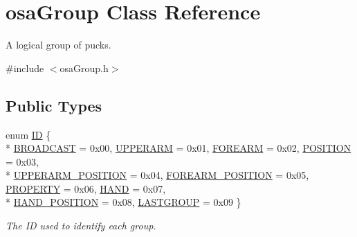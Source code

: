 \hypertarget{classosa_group}{\section{osa\-Group Class Reference}
\label{classosa_group}
}


A logical group of pucks.  




{\ttfamily \#include $<$osa\-Group.\-h$>$}

\subsection*{Public Types}
\begin{DoxyCompactItemize}
\item 
enum \hyperlink{classosa_group_a642da327f9e3c40d46293432b949f199}{I\-D} \{ \\*
\hyperlink{classosa_group_a642da327f9e3c40d46293432b949f199ae9534ab59a1ea39b9cee0501a8cd004c}{B\-R\-O\-A\-D\-C\-A\-S\-T} = 0x00, 
\hyperlink{classosa_group_a642da327f9e3c40d46293432b949f199a20d3ec176caaf6065d5e80a30b3a2d65}{U\-P\-P\-E\-R\-A\-R\-M} = 0x01, 
\hyperlink{classosa_group_a642da327f9e3c40d46293432b949f199a18cea4e0d67419684d28db8281ba6877}{F\-O\-R\-E\-A\-R\-M} = 0x02, 
\hyperlink{classosa_group_a642da327f9e3c40d46293432b949f199a99ec87c699a923e3bdd6f4e4b230e22b}{P\-O\-S\-I\-T\-I\-O\-N} = 0x03, 
\\*
\hyperlink{classosa_group_a642da327f9e3c40d46293432b949f199a57b3c6641deb0680e0b140eefa32d0b8}{U\-P\-P\-E\-R\-A\-R\-M\-\_\-\-P\-O\-S\-I\-T\-I\-O\-N} = 0x04, 
\hyperlink{classosa_group_a642da327f9e3c40d46293432b949f199a8123388fa93b393a7725578d1caf458e}{F\-O\-R\-E\-A\-R\-M\-\_\-\-P\-O\-S\-I\-T\-I\-O\-N} = 0x05, 
\hyperlink{classosa_group_a642da327f9e3c40d46293432b949f199a69e6ba263f5a6f04a4e480257c307cbb}{P\-R\-O\-P\-E\-R\-T\-Y} = 0x06, 
\hyperlink{classosa_group_a642da327f9e3c40d46293432b949f199aa463fb50faa1db162412a894a01f62b7}{H\-A\-N\-D} = 0x07, 
\\*
\hyperlink{classosa_group_a642da327f9e3c40d46293432b949f199a9e08fc09ee112b51b9f941c75ca880e9}{H\-A\-N\-D\-\_\-\-P\-O\-S\-I\-T\-I\-O\-N} = 0x08, 
\hyperlink{classosa_group_a642da327f9e3c40d46293432b949f199a4f5433f5002cb11361c614858e29b226}{L\-A\-S\-T\-G\-R\-O\-U\-P} = 0x09
 \}
\begin{DoxyCompactList}\small\item\em The I\-D used to identify each group. \end{DoxyCompactList}\item 

\end{DoxyCompactItemize}
